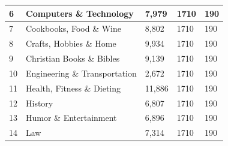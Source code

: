 \documentclass[12pt]{article}
\numberwithin{equation}{section}
\numberwithin{figure}{section}
\begin{document}
\begin{table}[]
\begin{tabular}{|l|l|l|l|l|}
	6              & Computers \& Technology       & 7,979                                                          & 1710                                                                            & 190                                                                         \\ \hline
	7              & Cookbooks, Food \& Wine       & 8,802                                                          & 1710                                                                            & 190                                                                         \\ \hline
	8              & Crafts, Hobbies \& Home       & 9,934                                                          & 1710                                                                            & 190                                                                         \\ \hline
	9              & Christian Books \& Bibles     & 9,139                                                          & 1710                                                                            & 190                                                                         \\ \hline
	10             & Engineering \& Transportation & 2,672                                                          & 1710                                                                            & 190                                                                         \\ \hline
	11             & Health, Fitness \& Dieting    & 11,886                                                         & 1710                                                                            & 190                                                                         \\ \hline
	12             & History                       & 6,807                                                          & 1710                                                                            & 190                                                                         \\ \hline
	13             & Humor \& Entertainment        & 6,896                                                          & 1710                                                                            & 190                                                                         \\ \hline
	14             & Law                           & 7,314                                                          & 1710                                                                            & 190                                                                         \\ \hline

\end{tabular}
\end{table}
\end{document}
